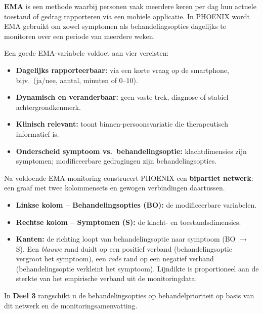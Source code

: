 \documentclass[11pt,a4paper]{article}
\begin{document}
\vspace{0.4em}
\begin{instrbox}[title={Ecological Momentary Assessment (EMA) -- basisprincipes}]
\small
\textbf{EMA} is een methode waarbij personen vaak meerdere keren per dag hun actuele
toestand of gedrag rapporteren via een mobiele applicatie. In PHOENIX wordt EMA
gebruikt om zowel symptomen als behandelingsopties dagelijks te monitoren over een periode
van meerdere weken.

Een goede EMA-variabele voldoet aan vier vereisten:
\begin{itemize}[topsep=2pt,itemsep=1pt]
\item \textbf{Dagelijks rapporteerbaar:} via een korte vraag op de smartphone, bijv.\ (ja/nee, aantal, minuten of 0--10).
\item \textbf{Dynamisch en veranderbaar:} geen vaste trek, diagnose of stabiel achtergrondkenmerk.
\item \textbf{Klinisch relevant:} toont binnen-persoonsvariatie die therapeutisch informatief is.
\item \textbf{Onderscheid symptoom vs.\ behandelingsoptie:} klachtdimensies zijn symptomen; modificeerbare gedragingen zijn behandelingsopties.
\end{itemize}
\end{instrbox}

\vspace{0.4em}
\begin{instrbox}[title={Het bipartiet netwerk: structuur van het observatiemodel}]
\small
Na voldoende EMA-monitoring construeert PHOENIX een \textbf{bipartiet netwerk}:
een graaf met twee kolommensets en gewogen verbindingen daartussen.
\begin{itemize}[topsep=2pt,itemsep=1pt]
\item \textbf{Linkse kolom -- Behandelingsopties (BO):} de modificeerbare variabelen.
\item \textbf{Rechtse kolom -- Symptomen (S):} de klacht- en toestandsdimensies.
\item \textbf{Kanten:} de richting loopt van behandelingsoptie naar symptoom (BO $\rightarrow$ S).
Een \emph{blauwe} rand duidt op een positief verband (behandelingsoptie vergroot het symptoom),
een \emph{rode} rand op een negatief verband (behandelingsoptie verkleint het symptoom).
Lijndikte is proportioneel aan de sterkte van het empirische verband uit de monitoringdata.
\end{itemize}
In \textbf{Deel 3} rangschikt u de behandelingsopties op behandelprioriteit op basis van
dit netwerk en de monitoringsamenvatting.
\end{instrbox}
\end{document}
